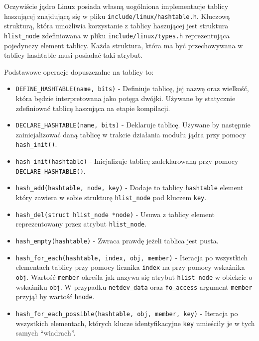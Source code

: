 Oczywiście jądro Linux posiada własną uogólniona implementacje tablicy
haszującej znajdującą się w pliku \texttt{include/linux/hashtable.h}.
Kluczową strukturą, która umożliwia korzystanie z tablicy haszującej
jest struktura \texttt{hlist\_node} zdefiniowana w pliku
\texttt{include/linux/types.h} reprezentująca pojedynczy element
tablicy. Każda struktura, która ma być przechowywana w tablicy hashtable
musi posiadać taki atrybut.

Podstawowe operacje dopuszczalne na tablicy to:

\begin{itemize}
\itemsep1pt\parskip0pt
\item
  \texttt{DEFINE\_HASHTABLE(name, bits)} - Definiuje tablicę, jej nazwę
  oraz wielkość, która będzie interpretowana jako potęga dwójki. Używane
  by statycznie zdefiniować tablicę haszująca na etapie kompilacji.
\item
  \texttt{DECLARE\_HASHTABLE(name, bits)} - Deklaruje tablicę. Używane
  by następnie zainicjalizować daną tablicę w trakcie działania modułu
  jądra przy pomocy \texttt{hash\_init()}.
\item
  \texttt{hash\_init(hashtable)} - Inicjalizuje tablicę zadeklarowaną
  przy pomocy \texttt{DECLARE\_HASHTABLE()}.
\item
  \texttt{hash\_add(hashtable, node, key)} - Dodaje to tablicy
  \texttt{hashtable} element który zawiera w sobie strukturę
  \texttt{hlist\_node} pod kluczem \texttt{key}.
\item
  \texttt{hash\_del(struct hlist\_node *node)} - Usuwa z tablicy element
  reprezentowany przez atrybut \texttt{hlist\_node}.
\item
  \texttt{hash\_empty(hashtable)} - Zwraca prawdę jeżeli tablica jest
  pusta.
\item
  \texttt{hash\_for\_each(hashtable, index, obj, member)} - Iteracja po
  wszystkich elementach tablicy przy pomocy licznika \texttt{index} na
  przy pomocy wskaźnika \texttt{obj}. Wartość \texttt{member} określa
  jak nazywa się atrybut \texttt{hlist\_node} w obiekcie o wskaźniku
  \texttt{obj}. W przypadku \texttt{netdev\_data} oraz
  \texttt{fo\_access} argument \texttt{member} przyjął by wartość
  \texttt{hnode}.
\item
  \texttt{hash\_for\_each\_possible(hashtable, obj, member, key)} -
  Iteracja po wszystkich elementach, których klucze identyfikacyjne
  \texttt{key} umieściły je w tych samych ``wiadrach''.
\end{itemize}

